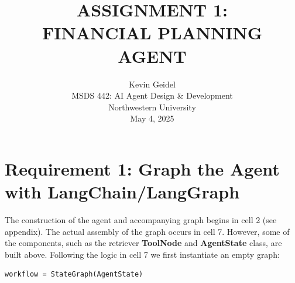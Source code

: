 \documentclass[11pt,letterpaper]{article}
\begin{document}
\selectfont
{}
\doublespacing
\setlength{\droptitle}{1in} 

\title{\large{ASSIGNMENT 1: \\ FINANCIAL PLANNING AGENT \\\vspace{1.2in}}}

\author{
Kevin Geidel \\
MSDS 442: AI Agent Design \& Development \\
Northwestern University \\
May 4, 2025 \\
}

\date{}
\maketitle
\thispagestyle{empty}	
\clearpage
\setcounter{page}{1}


\section*{Requirement 1: Graph the Agent with LangChain/LangGraph}
\tab The construction of the agent and accompanying graph begins in cell 2 (see appendix). 
The actual assembly of the graph occurs in cell 7. However, some of the components, such as the retriever \textbf{ToolNode} and \textbf{AgentState} class,
are built above. Following the logic in cell 7 we first instantiate an empty graph:

\begin{verbatim}
workflow = StateGraph(AgentState)
\end{verbatim}
\end{document}
